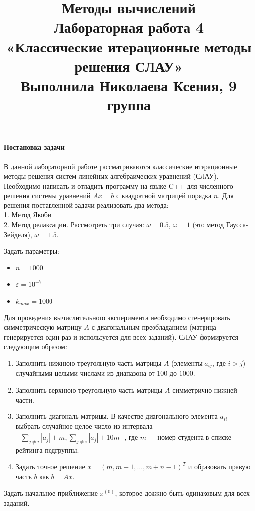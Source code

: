 \documentclass[a4paper, 12pt]{report}
\title{\textbf{\Huge{Методы вычислений}}\\Лабораторная работа 4\\«Классические итерационные методы решения СЛАУ»\\Выполнила Николаева Ксения, 9 группа}
\date{}
\begin{document}
    \maketitle

    \textbf{\Huge{Постановка задачи}}\\\\
    В данной лабораторной работе рассматриваются классические итерационные методы решения систем линейных алгебраических уравнений (СЛАУ). Необходимо написать и отладить программу на языке C++ для численного решения системы уравнений $Ax = b$ с квадратной матрицей порядка $n$.
Для решения поставленной задачи реализовать два метода:\\
1. Метод Якоби\\
2. Метод релаксации. Рассмотреть три случая: $\omega = 0.5$, $\omega = 1$ (это метод Гаусса-Зейделя), $\omega = 1.5$.


Задать параметры:
\begin{itemize}
    \item $n = 1000$
    \item $\varepsilon = 10^{-7}$
    \item $k_{max} = 1000$
\end{itemize}

Для проведения вычислительного эксперимента необходимо сгенерировать симметрическую матрицу $A$ с диагональным преобладанием (матрица генерируется один раз и используется для всех заданий). СЛАУ формируется следующим образом:

\begin{enumerate}
    \item Заполнить нижнюю треугольную часть матрицы $A$ (элементы $a_{ij}$, где $i > j$) случайными целыми числами из диапазона от $100$ до $1000$.
    \item Заполнить верхнюю треугольную часть матрицы $A$ симметрично нижней части.
    \item Заполнить диагональ матрицы. В качестве диагонального элемента $a_{ii}$ выбрать случайное целое число из интервала $\left[\sum_{j \neq i} |a_{j}| + m, \sum_{j \neq i} |a_{j}| + 10m\right]$, где $m$ — номер студента в списке рейтинга подгруппы.
    \item Задать точное решение $x = (m, m + 1, \ldots, m + n - 1)^T$ и образовать правую часть $b$ как $b = Ax$.
\end{enumerate}

Задать начальное приближение $x^{(0)}$, которое должно быть одинаковым для всех заданий.
\end{document}
